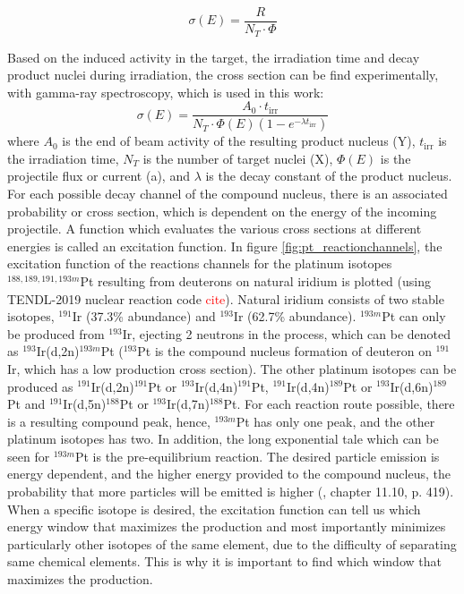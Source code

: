 \begin{equation}
    \sigma(E)=\frac{R}{N_T \cdot \Phi}
\end{equation}

Based on the induced activity in the target, the irradiation time and decay product nuclei during irradiation, the cross section can be find experimentally, with gamma-ray spectroscopy, which is used in this work: 
\begin{equation}  \label{eq:crossSection_simple}
    \sigma(E) = \frac{A_0 \cdot t_\text{irr}}{N_T \cdot \Phi(E)(1-e^{-\lambda t_\text{irr}})}
\end{equation}
\noindent where $A_0$ is the end of beam activity of the resulting product nucleus (Y), $t_\text{irr}$ is the irradiation time, $N_T$ is the number of target nuclei (X), $\Phi(E)$ is the projectile flux or current (a), and $\lambda$ is the decay constant of the product nucleus. \\ 

For each possible decay channel of the compound nucleus, there is an associated probability or cross section, which is dependent on the energy of the incoming projectile. A function which evaluates the various cross sections at different energies is called an excitation function. In figure \ref{fig:pt_reactionchannels}, the excitation function of the reactions channels for the platinum isotopes $^{188, 189, 191,193m}$Pt resulting from deuterons on natural iridium is plotted (using TENDL-2019 nuclear reaction code \textcolor{red}{cite}). Natural iridium consists of two stable isotopes, $^{191}$Ir (37.3\% abundance) and $^{193}$Ir (62.7\% abundance). $^{193m}$Pt can only be produced from $^{193}$Ir, ejecting 2 neutrons in the process, which can be denoted as $^{193}$Ir(d,2n)$^{193m}$Pt ($^{193}$Pt is the compound nucleus formation of deuteron on $^{191}$Ir, which has a low production cross section). The other platinum isotopes can be produced as $^{191}$Ir(d,2n)$^{191}$Pt or $^{193}$Ir(d,4n)$^{191}$Pt, $^{191}$Ir(d,4n)$^{189}$Pt or $^{193}$Ir(d,6n)$^{189}$Pt and $^{191}$Ir(d,5n)$^{188}$Pt or $^{193}$Ir(d,7n)$^{188}$Pt. For each reaction route possible, there is a resulting compound peak, hence, $^{193m}$Pt has only one peak, and the other platinum isotopes has two. In addition, the long exponential tale which can be seen for $^{193m}$Pt is the pre-equilibrium reaction. The desired particle emission is energy dependent, and the higher energy provided to the compound nucleus, the probability that more particles will be emitted is higher (\cite{KraneKennethS.Halliday1987}, chapter 11.10, p. 419). When a specific isotope is desired, the excitation function can tell us which energy window that maximizes the production and most importantly minimizes particularly other isotopes of the same element, due to the difficulty of separating same chemical elements. This is why it is important to find which window that maximizes the production. \\

